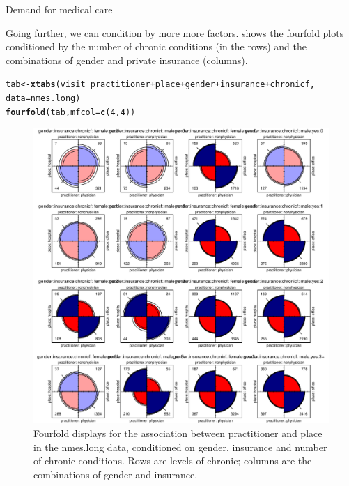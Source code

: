 \documentclass[11pt]{book}\usepackage[]{graphicx}\usepackage[]{color}
\makeatletter
\newcommand{\hlnum}[1]{\textcolor[rgb]{0.686,0.059,0.569}{#1}}%
\newcommand{\hlopt}[1]{\textcolor[rgb]{0,0,0}{#1}}%
\newcommand{\hlstd}[1]{\textcolor[rgb]{0.345,0.345,0.345}{#1}}%
\newcommand{\hlkwb}[1]{\textcolor[rgb]{0.69,0.353,0.396}{#1}}%
\newcommand{\hlkwc}[1]{\textcolor[rgb]{0.333,0.667,0.333}{#1}}%
\newcommand{\hlkwd}[1]{\textcolor[rgb]{0.737,0.353,0.396}{\textbf{#1}}}%
\newenvironment{kframe}{%
 \def\at@end@of@kframe{}%
 \ifinner\ifhmode%
  \def\at@end@of@kframe{\end{minipage}}%
  \begin{minipage}{\columnwidth}%
 \fi\fi%
 \def\FrameCommand##1{\hskip\@totalleftmargin \hskip-\fboxsep
 \colorbox{shadecolor}{##1}\hskip-\fboxsep
     \hskip-\linewidth \hskip-\@totalleftmargin \hskip\columnwidth}%
 \MakeFramed {\advance\hsize-\width
   \@totalleftmargin\z@ \linewidth\hsize
   \@setminipage}}%
 {\par\unskip\endMakeFramed%
 \at@end@of@kframe}
\newenvironment{knitrout}{}{} %
\renewenvironment{knitrout}{\small\renewcommand{\baselinestretch}{.85}}{} %
\makeatother
\begin{document}
\begin{Example}[nmes4]{Demand for medical care}
\begin{knitrout}
\end{knitrout}

Going further, we can condition by  more more factors.   shows the fourfold plots conditioned by
the number of chronic conditions (in the rows) and the combinations of
gender and  private insurance (columns). 

\begin{knitrout}
\color{fgcolor}\begin{kframe}
\begin{alltt}
\hlstd{tab} \hlkwb{<-} \hlkwd{xtabs}\hlstd{(visit} \hlopt{~} \hlstd{practitioner} \hlopt{+} \hlstd{place} \hlopt{+} \hlstd{gender} \hlopt{+} \hlstd{insurance} \hlopt{+} \hlstd{chronicf,}
             \hlkwc{data}\hlstd{=nmes.long)}
\hlkwd{fourfold}\hlstd{(tab,} \hlkwc{mfcol}\hlstd{=}\hlkwd{c}\hlstd{(}\hlnum{4}\hlstd{,}\hlnum{4}\hlstd{))}
\end{alltt}
\end{kframe}\begin{figure}[!htbp]


\centerline{\includegraphics[width=\textwidth]{ch09/fig/nmes4-fourfold2} }

\caption[Fourfold displays for the association between practitioner and place in the nmes]{Fourfold displays for the association between practitioner and place in the nmes.long data, conditioned on gender, insurance and number of chronic conditions. Rows are levels of chronic; columns are the combinations of gender and insurance.\label{fig:nmes4-fourfold2}}
\end{figure}



\end{knitrout}
\end{Example}
\end{document}
